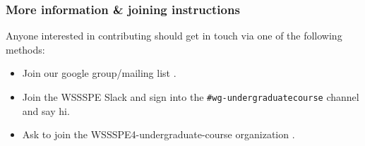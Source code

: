 \subsubsection{More information \& joining instructions}

Anyone interested in contributing should get in touch via one of the
following methods:

\begin{itemize}
\item Join our google group/mailing list
  \cite{WSSSPEUndergradGoogleGroup}.
\item Join the WSSSPE Slack \cite{WSSSPESlack} and sign into the
  \texttt{\#wg-undergraduatecourse} channel and say hi.
\item Ask to join the WSSSPE4-undergraduate-course organization
  \cite{WSSSPEUndergradGithub}.
\end{itemize}